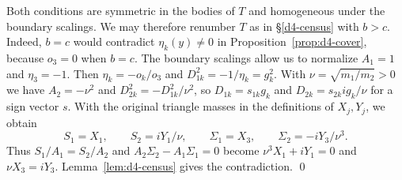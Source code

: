 \documentclass[Threeside,11pt]{article}
\theoremstyle{definition}
\theoremstyle{remark}
\numberwithin{equation}{section}
\theoremstyle{remark}
\begin{document}
{Both conditions are symmetric in the bodies of $T$ and homogeneous under
the boundary scalings. We may therefore renumber $T$ as in \S\ref{d4-census} with $b>c$.
Indeed, $b=c$ would contradict $\eta_k(y)\ne0$ in Proposition~\ref{prop:d4-cover},
because $o_3=0$ when $b=c$.
The boundary scalings allow us to normalize $A_1=1$ and $\eta_3=-1$.
Then $\eta_k=-o_k/o_3$ and $D_{1k}^2=-1/\eta_k=g_k^2$.
With $\nu=\sqrt{m_1/m_2}>0$ we have $A_2=-\nu^2$ and
$D_{2k}^2=-D_{1k}^2/\nu^2$, so
$D_{1k}=s_{1k}g_k$ and $D_{2k}=s_{2k}ig_k/\nu$ for a sign vector $s$.
With the original triangle masses in the definitions of $X_j,Y_j$, we obtain
\[
 S_1=X_1,\qquad S_2=iY_1/\nu,\qquad
 \Sigma_1=X_3,\qquad \Sigma_2=-iY_3/\nu^3.
\]
Thus $S_1/A_1=S_2/A_2$ and $A_2\Sigma_2-A_1\Sigma_1=0$ become
$\nu^3X_1+iY_1=0$ and $\nu X_3=iY_3$.
Lemma~\ref{lem:d4-census} gives the contradiction. \qed}
\end{document}
